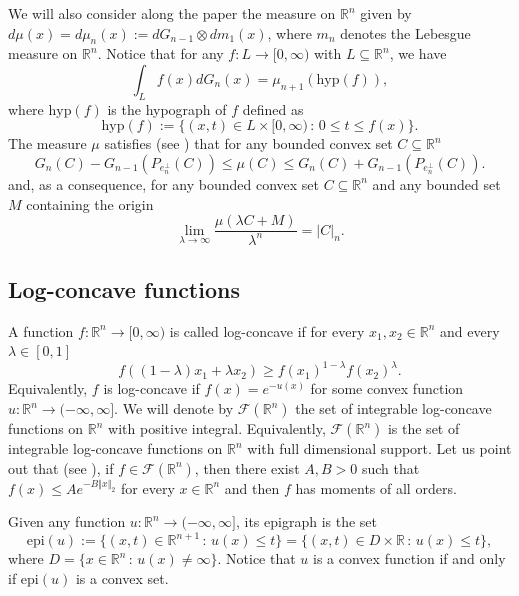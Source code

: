 \documentclass{amsart}
\newcommand{\R}{\mathbb R}
\theoremstyle{remark}
\theoremstyle{definition}
\numberwithin{equation}{section}
\begin{document}
We will also consider along the paper the measure on $\R^{n}$ given by $d\mu(x)=d\mu_n(x):=dG_{n-1}\otimes dm_1(x)$, where $m_n$ denotes the Lebesgue measure on $\R^n$. Notice that for any $f:L\to[0,\infty)$ with $L\subseteq\R^n$, we have
$$
\int_{L}f(x)dG_n(x)=\mu_{n+1}(\textrm{hyp}(f)),
$$
where $\textrm{hyp}(f)$ is the hypograph of $f$ defined as
$$
\textrm{hyp}(f):=\{(x,t)\in L\times[0,\infty)\,:\, 0\leq t\leq f(x)\}.
$$
The measure $\mu$ satisfies (see \cite[Lem. 4.2]{ALM}) that for any bounded convex set $C\subseteq\R^n$
\begin{equation}\label{eq:MuAndGn}
G_n(C)-G_{n-1}(P_{e_n^\perp}(C))\leq \mu(C)\leq G_n(C)+G_{n-1}(P_{e_n^\perp}(C)).
\end{equation}
and, as a consequence, for any bounded convex set $C\subseteq\R^n$ and any bounded set $M$ containing the origin
$$
\lim_{\lambda \to\infty}\frac{\mu(\lambda C+M)}{\lambda^n}=|C|_n.
$$

\subsection{Log-concave functions}\label{sec:LogconcaveFunctions}

A function $f:\R^n\to[0,\infty)$ is called log-concave if for every $x_1,x_2\in\R^n$ and every $\lambda\in[0,1]$
$$
f((1-\lambda)x_1+\lambda x_2)\geq f(x_1)^{1-\lambda}f(x_2)^\lambda.
$$
Equivalently, $f$ is log-concave if $f(x)=e^{-u(x)}$ for some convex function $u:\R^n\to(-\infty,\infty]$. We will denote by $\mathcal{F}(\R^n)$ the set of integrable log-concave functions on $\R^n$ with positive integral. Equivalently, $\mathcal{F}(\R^n)$ is the set of integrable log-concave functions on $\R^n$ with full dimensional support. Let us point out that (see \cite[Lem. 2.2.1]{BGVV}), if $f\in\mathcal{F}(\R^n)$, then there exist $A,B>0$ such that $f(x)\leq A e^{-B\Vert x\Vert_2}$ for every $x\in\R^n$ and then $f$ has moments of all orders.

Given any function $u:\R^n\to(-\infty,\infty]$, its epigraph is the set
$$
\textrm{epi}(u):=\{(x,t)\in\R^{n+1}\,:\, u(x)\leq t\}=\{(x,t)\in D\times\R\,:\, u(x)\leq t\},
$$
where $D=\{x\in\R^n\,:\,u(x)\neq\infty\}$. Notice that  $u$ is a convex function if and only if $\textrm{epi}(u)$ is a convex set.
\end{document}
